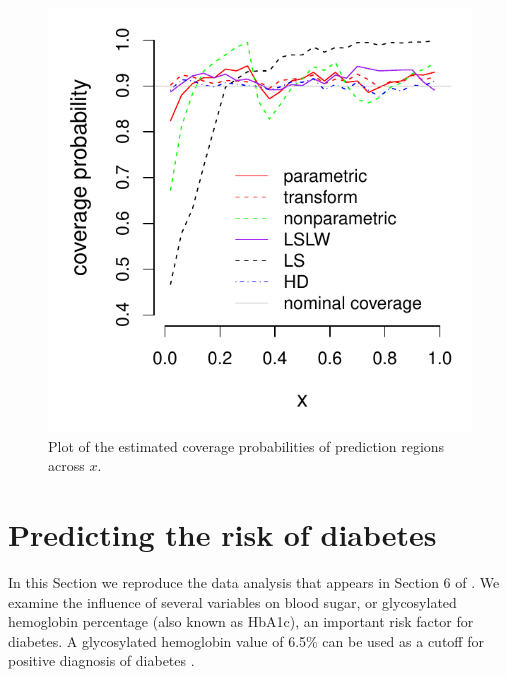 \documentclass[11pt]{article}\usepackage[]{graphicx}\usepackage[]{color}
\makeatletter
\def\maxwidth{ %
  \ifdim\Gin@nat@width>\linewidth
    \linewidth
  \else
    \Gin@nat@width
  \fi
}
\newenvironment{knitrout}{}{} %
\makeatother
\begin{document}
\begin{figure}[h!]
\begin{center}
\begin{knitrout}
\color{fgcolor}
\includegraphics[width=\maxwidth]{figure/readme-inx-1} 

\end{knitrout}
\end{center}
\caption{Plot of the estimated coverage probabilities of prediction regions 
  across $x$.}
\label{Fig:coverageinx500.3}
\end{figure}




\newpage
\section{Predicting the risk of diabetes}
\label{sec:diabetes}

In this Section we reproduce the data analysis that appears in Section 6 of 
\citet{eck2019conformal}.  
We examine the influence of several variables on blood sugar, or glycosylated 
hemoglobin percentage (also known as HbA1c), an important risk factor for 
diabetes.  A glycosylated hemoglobin value of 6.5\% can be used as a cutoff 
for positive diagnosis of diabetes \citep{world2011use}. 
\end{document}
